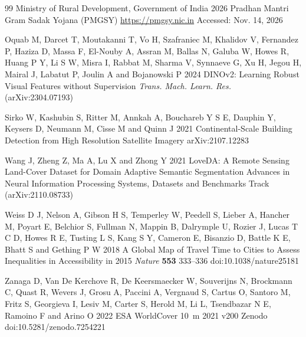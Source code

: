 \begin{thebibliography}{99}
 Ministry of Rural Development, Government of India 2026 Pradhan Mantri Gram Sadak Yojana ({PMGSY}) \url{https://pmgsy.nic.in} Accessed: Nov. 14, 2026

 Oquab M, Darcet T, Moutakanni T, Vo H, Szafraniec M, Khalidov V, Fernandez P, Haziza D, Massa F, El-Nouby A, Assran M, Ballas N, Galuba W, Howes R, Huang P Y, Li S W, Misra I, Rabbat M, Sharma V, Synnaeve G, Xu H, Jegou H, Mairal J, Labatut P, Joulin A and Bojanowski P 2024 {DINOv2}: Learning Robust Visual Features without Supervision {\it Trans. Mach. Learn. Res.} (arXiv:2304.07193)

 Sirko W, Kashubin S, Ritter M, Annkah A, Bouchareb Y S E, Dauphin Y, Keysers D, Neumann M, Cisse M and Quinn J 2021 Continental-Scale Building Detection from High Resolution Satellite Imagery arXiv:2107.12283

 Wang J, Zheng Z, Ma A, Lu X and Zhong Y 2021 {LoveDA}: A Remote Sensing Land-Cover Dataset for Domain Adaptive Semantic Segmentation Advances in Neural Information Processing Systems, Datasets and Benchmarks Track (arXiv:2110.08733)

 Weiss D J, Nelson A, Gibson H S, Temperley W, Peedell S, Lieber A, Hancher M, Poyart E, Belchior S, Fullman N, Mappin B, Dalrymple U, Rozier J, Lucas T C D, Howes R E, Tusting L S, Kang S Y, Cameron E, Bisanzio D, Battle K E, Bhatt S and Gething P W 2018 A Global Map of Travel Time to Cities to Assess Inequalities in Accessibility in 2015 {\it Nature} {\bf 553} 333--336 doi:10.1038/nature25181

 Zanaga D, Van De Kerchove R, De Keersmaecker W, Souverijns N, Brockmann C, Quast R, Wevers J, Grosu A, Paccini A, Vergnaud S, Cartus O, Santoro M, Fritz S, Georgieva I, Lesiv M, Carter S, Herold M, Li L, Tsendbazar N E, Ramoino F and Arino O 2022 {ESA WorldCover} 10~m 2021 v200 Zenodo doi:10.5281/zenodo.7254221

\end{thebibliography}